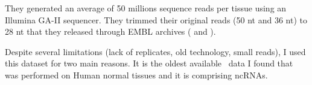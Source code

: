     They generated an average of 50 millions sequence reads per tissue
    using an Illumina GA-II sequencer. They trimmed their original reads
    (50 \gls{nt}
    and 36 \gls{nt}) to 28 \gls{nt} that they released through EMBL archives
    ( and ).

    Despite several limitations (lack of replicates, old technology, small reads),
    I used this dataset for two main reasons. It is the oldest available \Rnaseq\
    data I found that was performed on Human normal tissues and it is comprising
    \glspl{ncRNA}.


